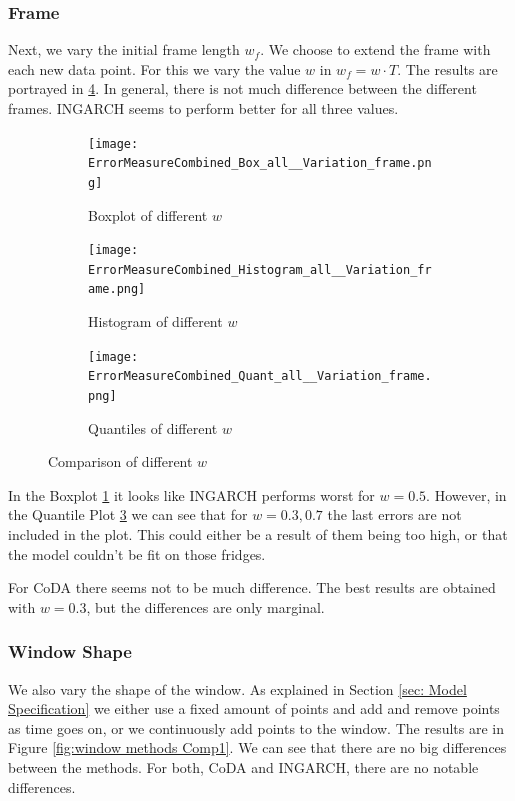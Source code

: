 \subsubsection{Frame}
\label{sec:Frame}

Next, we vary the initial frame length $w_f$. We choose to extend the frame with each new data point. For this we vary the value $w$ in $w_f=w\cdot T$. The results are portrayed in \ref{fig:Frame Comp1}. In general, there is not much difference between the different frames. INGARCH seems to perform better for all three values.
\begin{figure}[htb!]
\centering
\begin{subfigure}[b]{0.4\textwidth}
\texttt{[image: ErrorMeasureCombined\_Box\_all\_\_Variation\_frame.png]}
\caption{Boxplot of different $w$}
\label{fig:Frame Box}
\end{subfigure}
\hfill
\begin{subfigure}[b]{0.4\textwidth}
\texttt{[image: ErrorMeasureCombined\_Histogram\_all\_\_Variation\_frame.png]}
\caption{Histogram of different $w$}
\label{fig:Frame Hist}
\end{subfigure}
\hfill
\begin{subfigure}[b]{0.6\textwidth}
\texttt{[image: ErrorMeasureCombined\_Quant\_all\_\_Variation\_frame.png]}
\caption{Quantiles of different $w$}
\label{fig:Frame Quant}
\end{subfigure}
\caption{Comparison of different $w$}
\label{fig:Frame Comp1}
\end{figure}


In the Boxplot \ref{fig:Frame Box} it looks like INGARCH performs worst for $w=0.5$. However, in the Quantile Plot \ref{fig:Frame Quant} we can see that for $w=0.3,0.7$ the last errors are not included  in the plot. This could either be a result of them being too high, or that the model couldn't be fit on those fridges. 

For CoDA there seems not to be much difference. The best results are obtained with $w=0.3$, but the differences are only marginal. 


\subsubsection{Window Shape}
\label{sec:Window Shape}

We also vary the shape of the window. As explained in Section \ref{sec: Model Specification} we either use a fixed amount of points and add and remove points as time goes on, or we continuously add points to the window. The results are in Figure \ref{fig:window methods Comp1}. We can see that there are no big differences between the methods. For both, CoDA and INGARCH, there are no notable differences. 

